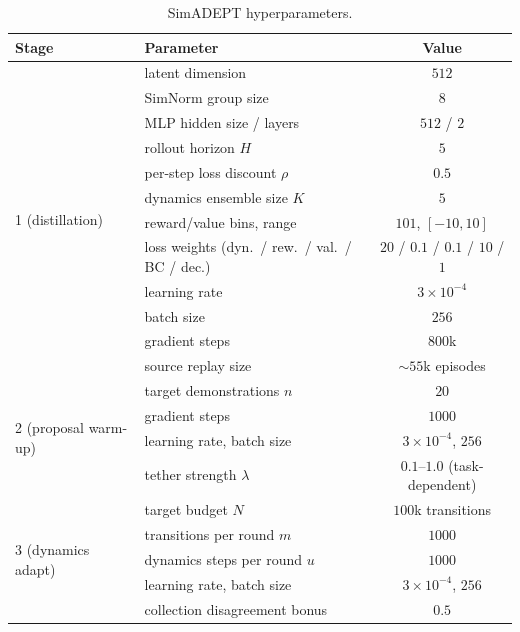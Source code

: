 \documentclass{article} %
\begin{document}
\begin{table}[h]
\centering
\caption{SimADEPT hyperparameters.}
\label{tab:app-hparams}
\small
\begin{tabular}{llc}
\toprule
Stage & Parameter & Value \\
\midrule
\multirow{12}{*}{1 (distillation)}
 & latent dimension & $512$ \\
 & SimNorm group size & $8$ \\
 & MLP hidden size / layers & $512$ / $2$ \\
 & rollout horizon $H$ & $5$ \\
 & per-step loss discount $\rho$ & $0.5$ \\
 & dynamics ensemble size $K$ & $5$ \\
 & reward/value bins, range & $101$, $[-10, 10]$ \\
 & loss weights (dyn.\ / rew.\ / val.\ / BC / dec.) & $20$ / $0.1$ / $0.1$ / $10$ / $1$ \\
 & learning rate & $3\times10^{-4}$ \\
 & batch size & $256$ \\
 & gradient steps & $800$k \\
 & source replay size & $\sim$$55$k episodes \\
\midrule
\multirow{4}{*}{2 (proposal warm-up)}
 & target demonstrations $n$ & $20$ \\
 & gradient steps & $1000$ \\
 & learning rate, batch size & $3\times10^{-4}$, $256$ \\
 & tether strength $\lambda$ & $0.1$--$1.0$ (task-dependent) \\
\midrule
\multirow{6}{*}{3 (dynamics adapt)}
 & target budget $N$ & $100$k transitions \\
 & transitions per round $m$ & $1000$ \\
 & dynamics steps per round $u$ & $1000$ \\
 & learning rate, batch size & $3\times10^{-4}$, $256$ \\
 & collection disagreement bonus & $0.5$ \\
\bottomrule
\end{tabular}
\end{table}
\end{document}
